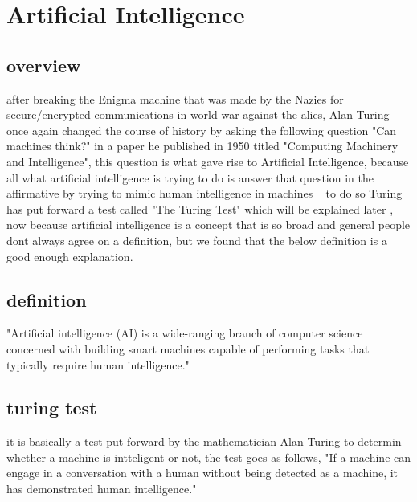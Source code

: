 \section{Artificial Intelligence}
\subsection{overview} 
        after breaking the Enigma machine that was made by the Nazies for secure/encrypted communications in world war against the alies, Alan Turing once again changed the course of history by asking the following question "Can machines think?" in a paper he published in 1950 titled "Computing Machinery and Intelligence", this question is what gave rise to Artificial Intelligence, because all what artificial intelligence is trying to do is answer that question in the affirmative by trying to mimic human intelligence in machines ~\cite{ai} to do so Turing has put forward a test called "The Turing Test" which will be explained later , now because artificial intelligence is a concept that is  so broad and general people dont always agree on a definition, but we found that the below definition is a good enough explanation.
        
    \subsection{definition}
        "Artificial intelligence (AI) is a wide-ranging branch of computer science concerned with building smart machines capable of performing tasks that typically require human intelligence." ~\cite{ai}

    \subsection{turing test}
        it is basically a test put forward by the mathematician Alan Turing to determin whether a machine is intteligent or not, the test goes as follows, "If a machine can engage in a conversation with a human without being detected as a machine, it has demonstrated human intelligence." ~\cite{turing}
    

